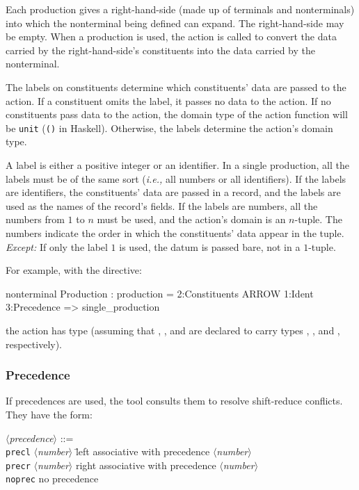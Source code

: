 \documentclass[10pt]{article}
\newcommand{\nonterm}[1]{\mbox{$\langle${\it{}#1}$\rangle$}}
\begin{document}
\begin{strictcode}
\begin{strictcode}
\begin{strictcode}
\begin{strictcode}
\begin{strictcode}
\begin{strictcode}
\begin{strictcode}
Each production gives a right-hand-side (made up of terminals and
nonterminals) into which the nonterminal being defined can expand.
The right-hand-side may be empty.  When a production is used, the
action is called to convert the data carried by the right-hand-side's
constituents into the data carried by the nonterminal.

The labels on constituents determine which constituents' data are
passed to the action.  If a constituent omits the label, it passes no
data to the action.  If no constituents pass data to the action, the
domain type of the action function will be {\tt unit} ({\tt ()} in
Haskell).  Otherwise, the labels determine the action's domain type.

A label is either a positive integer or an identifier.  In a single
production, all the labels must be of the same sort ({\em i.e.,} all
numbers or all identifiers).  If the labels are identifiers, the
constituents' data are passed in a record, and the labels are used as
the names of the record's fields.  If the labels are numbers, all the
numbers from $1$ to $n$ must be used, and the action's domain is an
$n$-tuple.  The numbers indicate the order in which the constituents'
data appear in the tuple.  {\em Except:} If only the label $1$ is
used, the datum is passed bare, not in a $1$-tuple.

For example, with the directive:

\begin{code}
nonterminal Production : production =
   2:Constituents ARROW 1:Ident 3:Precedence => single_production
\end{code}

\noindent
the action  has type  (assuming that , , and
 are declared to carry types ,
, and , respectively).



\subsubsection{Precedence}

If precedences are used, the tool consults them to resolve
shift-reduce conflicts.  They have the form:

\begin{tabbing}
\nonterm{precedence} ::=
\\
\quad \=
{\tt precl} \nonterm{number} \quad
\= left associative with precedence \nonterm{number}
\\ \>
{\tt precr} \nonterm{number} \>
right associative with precedence \nonterm{number}
\\ \>
{\tt noprec} \>
no precedence
\end{tabbing}


\end{strictcode}
\end{strictcode}
\end{strictcode}
\end{strictcode}
\end{strictcode}
\end{strictcode}
\end{strictcode}
\end{document}
